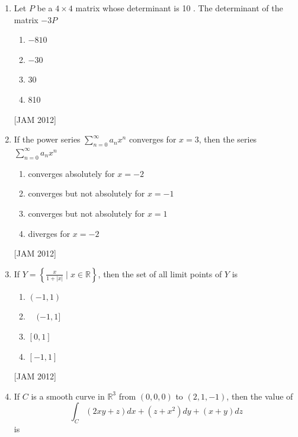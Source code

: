 \begin{enumerate}
\begin{enumerate}
    \item 0 
\item 1 
\item 2 
\item 3
\end{enumerate}
\hfill [JAM 2012]





\item  Let $P$ be a $4 \times 4$ matrix whose determinant is 10 . The determinant of the matrix $-3 P$ 
\begin{enumerate}
  \item $-810$ 
\item $-30$ 
\item 30 
\item 810  
\end{enumerate}
\hfill [JAM 2012]





\item  If the power series $\sum_{n=0}^{\infty} a_{n} x^{n}$ converges for $x=3$, then the series $\sum_{n=0}^{\infty} a_{n} x^{n}$ 

\begin{enumerate}
    \item converges absolutely for $x=-2$ 
\item converges but not absolutely for $x=-1$ 
\item converges but not absolutely for $x=1$ 
\item diverges for $x=-2$
\end{enumerate}
\hfill [JAM 2012]





\item  If $Y=\left\{\frac{x}{1+|x|} \mid x \in \mathbb{R}\right\}$, then the set of all limit points of $Y$ is 

\begin{enumerate}
    \item $(-1,1)$ 
\item $\quad(-1,1]$ 
\item $[0,1]$ 
\item $[-1,1]$
\end{enumerate}
\hfill [JAM 2012]





\item  If $C$ is a smooth curve in $\mathbb{R}^{3}$ from $(0,0,0)$ to $(2,1,-1)$, then the value of
$$
\int_{C}(2 x y+z) d x+\left(z+x^{2}\right) d y+(x+y) d z
$$
is 


\end{enumerate}
